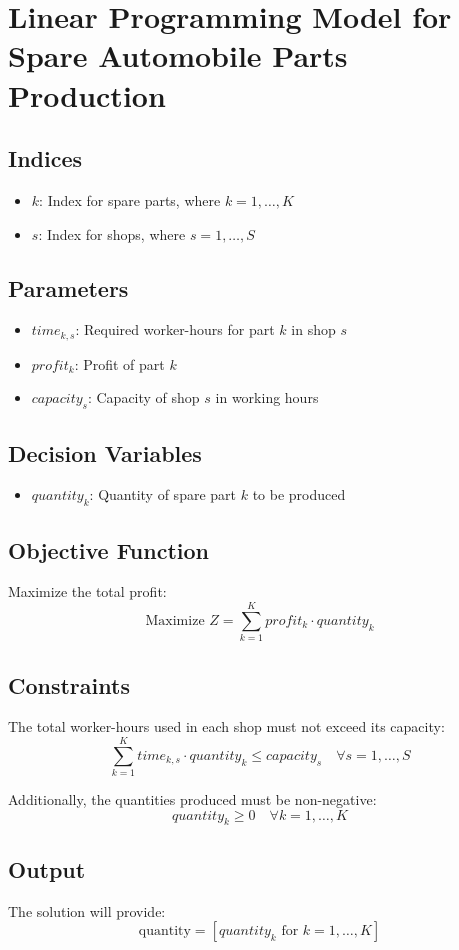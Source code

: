 \documentclass{article}
\begin{document}
\section*{Linear Programming Model for Spare Automobile Parts Production}

\subsection*{Indices}
\begin{itemize}
    \item $k$: Index for spare parts, where $k = 1, \ldots, K$
    \item $s$: Index for shops, where $s = 1, \ldots, S$
\end{itemize}

\subsection*{Parameters}
\begin{itemize}
    \item $time_{k, s}$: Required worker-hours for part $k$ in shop $s$
    \item $profit_{k}$: Profit of part $k$
    \item $capacity_{s}$: Capacity of shop $s$ in working hours
\end{itemize}

\subsection*{Decision Variables}
\begin{itemize}
    \item $quantity_{k}$: Quantity of spare part $k$ to be produced
\end{itemize}

\subsection*{Objective Function}
Maximize the total profit:
\[
\text{Maximize } Z = \sum_{k=1}^{K} profit_{k} \cdot quantity_{k}
\]

\subsection*{Constraints}
The total worker-hours used in each shop must not exceed its capacity:
\[
\sum_{k=1}^{K} time_{k, s} \cdot quantity_{k} \leq capacity_{s} \quad \forall s = 1, \ldots, S
\]

Additionally, the quantities produced must be non-negative:
\[
quantity_{k} \geq 0 \quad \forall k = 1, \ldots, K
\]

\subsection*{Output}
The solution will provide:
\[
\text{quantity} = [quantity_{k} \text{ for } k = 1, \ldots, K]
\]
\end{document}
